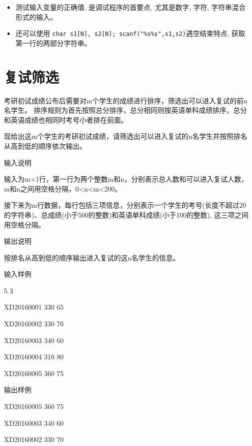 \begin{note}[要点]
	\begin{itemize}
		\item 测试输入变量的正确值, 是调试程序的首要点, 尤其是数字, 字符, 字符串混合形式的输入。
		\item 还可以使用 \lstinline|char s1[N], s2[N]; scanf("%s%s",s1,s2)|遇空结束特点, 获取第一行的两部分字符串。
	\end{itemize}
	
\end{note}

\section{复试筛选}	
考研初试成绩公布后需要对m个学生的成绩进行排序，筛选出可以进入复试的前n名学生。
排序规则为首先按照总分排序，总分相同则按英语单科成绩排序，总分和英语成绩也相同时考号小者排在前面。

现给出这m个学生的考研初试成绩，请筛选出可以进入复试的n名学生并按照排名从高到低的顺序依次输出。

输入说明	

输入为m+1行，第一行为两个整数m和n，分别表示总人数和可以进入复试人数，m和n之间用空格分隔，0<n<m<200。

接下来为m行数据，每行包括三项信息，分别表示一个学生的考号(长度不超过20的字符串)、总成绩(小于500的整数)和英语单科成绩(小于100的整数), 这三项之间用空格分隔。

输出说明

按排名从高到低的顺序输出进入复试的这n名学生的信息。

输入样例	

5 3

XD20160001 330 65

XD20160002 330 70

XD20160003 340 60

XD20160004 310 80

XD20160005 360 75

输出样例	

XD20160005 360 75

XD20160003 340 60

XD20160002 330 70


